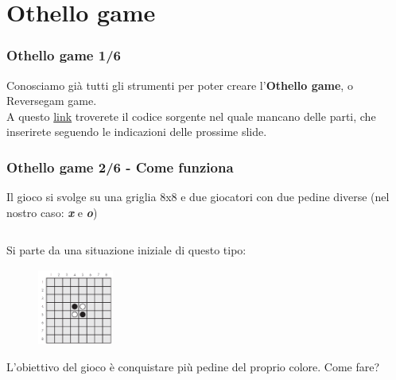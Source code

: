 \documentclass{beamer}
\begin{document}
\section{Othello game}

\begin{frame}[fragile]
\frametitle{Othello game 1/6}
Conosciamo già tutti gli strumenti per poter creare l'\textbf{Othello game}, o Reversegam game.\\
A questo \href{https://raw.githubusercontent.com/ragazzedigitalicesena/slide-2019/master/tex/chapter_14-15/reversegam.py}{link} troverete il codice sorgente nel quale mancano delle parti, che inserirete seguendo le indicazioni delle prossime slide.
\end{frame}

\begin{frame}[fragile]
\frametitle{Othello game 2/6 - Come funziona}
Il gioco si svolge su una griglia 8x8 e due giocatori con due pedine diverse (nel nostro caso: \textit{\textbf{x}} e \textit{\textbf{o}})
\begin{columns}
	\begin{column}[T]{0.3\textwidth}
		\begin{center}
			Si parte da una situazione iniziale di questo tipo:		
		\begin{figure}[t]
			\includegraphics[height=2.5cm, width=2.5cm]{images/ReverseGame1.png}
		\end{figure}
			L'obiettivo del gioco è conquistare più pedine del proprio colore. Come fare?
		\end{center}
	

\end{column}
\end{columns}
\end{frame}
\end{document}
